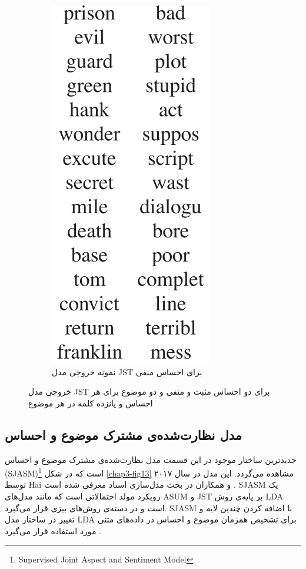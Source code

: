 \begin{figure}[!b]
\begin{subfigure}{0.4\textwidth}
			\includegraphics[scale=0.2]{chap3-img/JSTexamplen}
			\caption{نمونه خروجی مدل JST برای احساس منفی}
			\label{chap3-fig12-2}
		\end{subfigure}
		\caption{خروجی مدل JST برای دو احساس مثبت و منفی‌ و دو موضوع برای هر احساس و پانزده کلمه در هر موضوع \cite{lin2012weakly}}
		\label{chap3-fig12}
	\end{figure}

\subsection{مدل نظارت‌شده‌ی مشترک موضوع و احساس}
\label{chap3sec4sub3}
جدیدترین ساختار موجود در این قسمت مدل نظارت‌شده‌ی مشترک موضوع و احساس
(SJASM)\footnote{Supervised Joint Aspect and Sentiment Model}
است که در شکل
\ref{chap3-fig13}
 مشاهده می‌گردد. این مدل در سال ۲۰۱۷ توسط 
Hai
و همکاران در بحث مدل‌سازی اسناد معرفی‌ شده است \cite{7855825}. 
SJASM
یک رویکرد مولد احتمالاتی است که مانند مدل‌های 
ASUM
و 
JST
بر پایه‌ی روش 
LDA
است و در دسته‌ی روش‌های بیزی قرار می‌گیرد. SJASM با اضافه کردن چندین لایه و تغییر در ساختار مدل 
LDA
برای تشخیص همزمان موضوع و احساس در داده‌های متنی مورد استفاده قرار می‌گیرد
\cite{7855825}.

